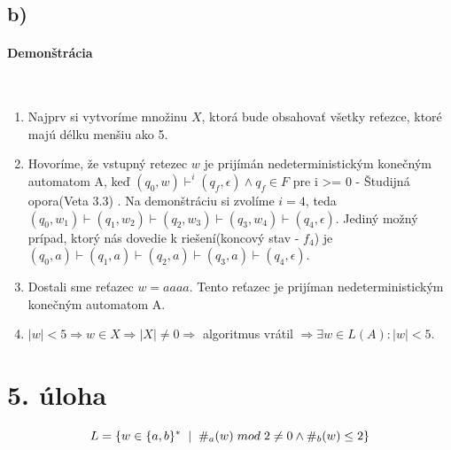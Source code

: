 \documentclass[11pt,a4paper]{article}
\begin{document}
\subsection{b)}

\paragraph{Demonštrácia}\mbox{{}}\\
\begin{enumerate}
  \item Najprv si vytvoríme množinu $X$, ktorá bude obsahovať všetky reťezce, ktoré majú délku menšiu ako 5.

  \item Hovoríme, že vstupný retezec $w$ je prijímán nedeterministickým konečným automatom A, keď  $(q_0, w) \vdash^i (q_f,\epsilon) \land q_f \in F$ pre i >= 0 - Študijná opora(Veta 3.3) \cite{AA}.
Na demonštráciu si zvolíme $i = 4$, teda $(q_0, w_1) \vdash (q_1, w_2) \vdash (q_2, w_3) \vdash (q_3, w_4) \vdash (q_4, \epsilon)$. Jediný možný prípad, ktorý nás dovedie k riešení(koncový stav - $f_4$)
je $(q_0, a) \vdash (q_1, a) \vdash (q_2, a) \vdash (q_3, a) \vdash (q_4, \epsilon)$.

  \item Dostali sme reťazec $w = aaaa$. Tento reťazec je prijíman nedeterministickým konečným automatom A.
  \item $|w| < 5 \Rightarrow w \in X \Rightarrow |X| \ne 0 \Rightarrow$ algoritmus vrátil  $\Rightarrow \exists w \in L(A) : |w| < 5$.
\end{enumerate}


\newpage
\section{5. úloha}

\begin{equation}
L = \{ w \in \{a, b\}^* \hspace{0.2cm}| \hspace{0.2cm} \#_a(w) \hspace{0.1cm} mod \hspace{0.1cm} 2 \ne 0 \land \#_b(w) \le 2 \}
\end{equation}
\end{document}
